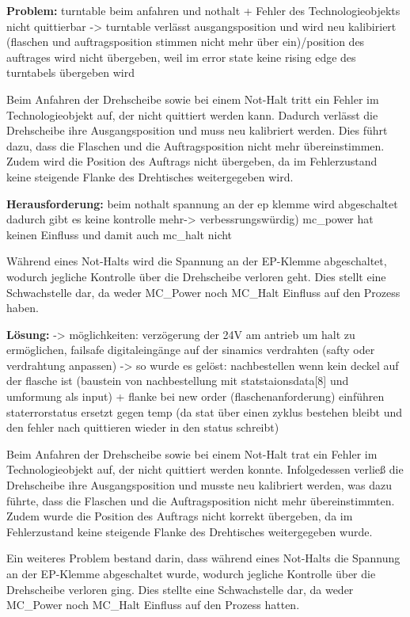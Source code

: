 \textbf{Problem:}
turntable beim anfahren und nothalt + Fehler des Technologieobjekts nicht quittierbar -> turntable verlässt ausgangsposition und wird neu kalibiriert (flaschen und auftragsposition stimmen nicht mehr über ein)/position des auftrages wird nicht übergeben, weil im error state keine rising edge des turntabels übergeben wird

Beim Anfahren der Drehscheibe sowie bei einem Not-Halt tritt ein Fehler im Technologieobjekt auf, der nicht quittiert werden kann. Dadurch verlässt die Drehscheibe ihre Ausgangsposition und muss neu kalibriert werden. Dies führt dazu, dass die Flaschen und die Auftragsposition nicht mehr übereinstimmen. Zudem wird die Position des Auftrags nicht übergeben, da im Fehlerzustand keine steigende Flanke des Drehtisches weitergegeben wird.

\textbf{Herausforderung:} 
beim nothalt spannung an der ep klemme wird abgeschaltet dadurch gibt es keine kontrolle mehr-> verbessrungswürdig) mc_power hat keinen Einfluss und damit auch mc_halt nicht

Während eines Not-Halts wird die Spannung an der EP-Klemme abgeschaltet, wodurch jegliche Kontrolle über die Drehscheibe verloren geht. Dies stellt eine Schwachstelle dar, da weder MC_Power noch MC_Halt Einfluss auf den Prozess haben.

\textbf{Lösung:}  
-> möglichkeiten: verzögerung der 24V am antrieb um halt zu ermöglichen, failsafe digitaleingänge auf der sinamics verdrahten (safty oder verdrahtung anpassen)
-> so wurde es gelöst: nachbestellen wenn kein deckel auf der flasche ist (baustein von nachbestellung mit statstaionsdata[8] und umformung als input) + flanke bei new order (flaschenanforderung) einführen
staterrorstatus ersetzt gegen temp (da stat über einen zyklus bestehen bleibt und den fehler nach quittieren wieder in den status schreibt)

Beim Anfahren der Drehscheibe sowie bei einem Not-Halt trat ein Fehler im Technologieobjekt auf, der nicht quittiert werden konnte. Infolgedessen verließ die Drehscheibe ihre Ausgangsposition und musste neu kalibriert werden, was dazu führte, dass die Flaschen und die Auftragsposition nicht mehr übereinstimmten. Zudem wurde die Position des Auftrags nicht korrekt übergeben, da im Fehlerzustand keine steigende Flanke des Drehtisches weitergegeben wurde.

Ein weiteres Problem bestand darin, dass während eines Not-Halts die Spannung an der EP-Klemme abgeschaltet wurde, wodurch jegliche Kontrolle über die Drehscheibe verloren ging. Dies stellte eine Schwachstelle dar, da weder MC_Power noch MC_Halt Einfluss auf den Prozess hatten.

